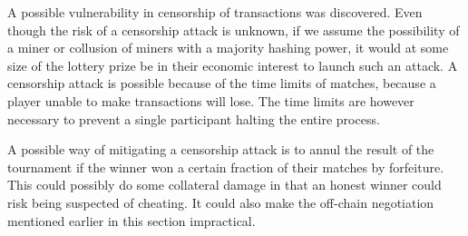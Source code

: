 A possible vulnerability in censorship of transactions was discovered. Even though the risk of a censorship attack is unknown, if we assume the possibility of a miner or collusion of miners with a majority hashing power, it would at some size of the lottery prize be in their economic interest to launch such an attack. A censorship attack is possible because of the time limits of matches, because a player unable to make transactions will lose. The time limits are however necessary to prevent a single participant halting the entire process. 

A possible way of mitigating a censorship attack is to annul the result of the tournament if the winner won a certain fraction of their matches by forfeiture. This could possibly do some collateral damage in that an honest winner could risk being suspected of cheating. It could also make the off-chain negotiation mentioned earlier in this section impractical. 

